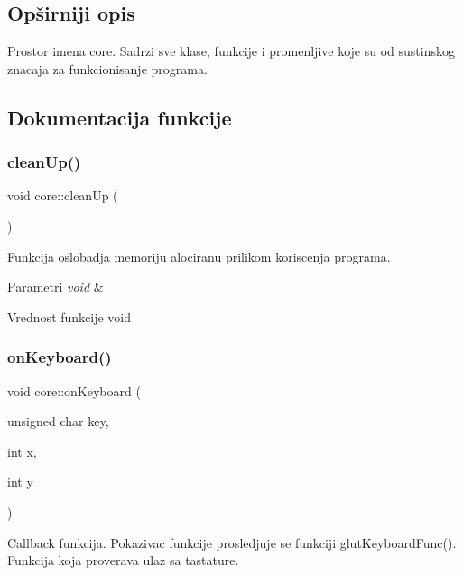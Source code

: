 \subsection{Opširniji opis}
Prostor imena core. Sadrzi sve klase, funkcije i promenljive koje su od sustinskog znacaja za funkcionisanje programa. 

\subsection{Dokumentacija funkcije}
\mbox{\label{namespacecore_aa39dd0a5d67c7531b2adf84acb6bb496}} 
\subsubsection{\texorpdfstring{clean\+Up()}{cleanUp()}}
{\footnotesize\ttfamily void core\+::clean\+Up (\begin{DoxyParamCaption}{ }\end{DoxyParamCaption})}



Funkcija oslobadja memoriju alociranu prilikom koriscenja programa. 


\begin{DoxyParams}{Parametri}
{\em void} & \\
\hline
\end{DoxyParams}
\begin{DoxyReturn}{Vrednost funkcije}
void 
\end{DoxyReturn}
\mbox{\label{namespacecore_a179fad39a2b3f74cf7a0bffb578fce00}} 
\subsubsection{\texorpdfstring{on\+Keyboard()}{onKeyboard()}}
{\footnotesize\ttfamily void core\+::on\+Keyboard (\begin{DoxyParamCaption}\item[{unsigned char}]{key,  }\item[{int}]{x,  }\item[{int}]{y }\end{DoxyParamCaption})}



Callback funkcija. Pokazivac funkcije prosledjuje se funkciji glut\+Keyboard\+Func(). Funkcija koja proverava ulaz sa tastature. 


